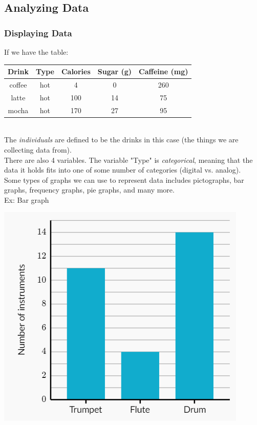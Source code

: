 \subsection{Analyzing Data}
\subsubsection{Displaying Data}
If we have the table:\\

\begin{tabular}{c|c|c|c|c}
    Drink & Type & Calories & Sugar (g) & Caffeine (mg)\\
    \hline
    coffee & hot & 4 & 0 & 260\\
    latte & hot & 100 & 14 & 75\\
    mocha & hot & 170 & 27 & 95
\end{tabular}\\
The \textit{individuals} are defined to be the drinks in this case (the things we are collecting data from).\\
There are also 4 variables. The variable "Type" is \textit{categorical}, meaning that the data it holds fits into one of some number of categories (digital vs. analog).\\
Some types of graphs we can use to represent data includes pictographs, bar graphs, frequency graphs, pie graphs, and many more.\\
Ex: Bar graph\\
\centerline{\includegraphics[scale=0.7]{FundamentalsPictures/barGraph.png}}
